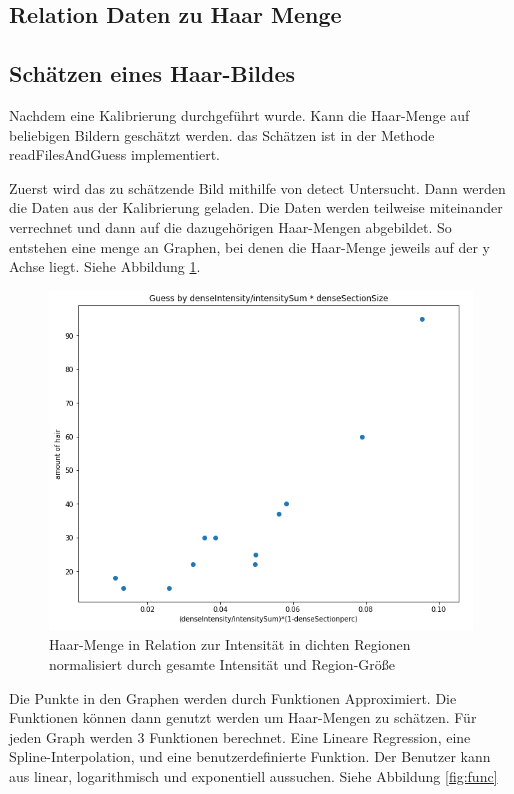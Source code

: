 \documentclass[german,a4paper,12pt]{llncs}
\begin{document}
\subsection{Relation Daten zu Haar Menge}



\subsection{Schätzen eines Haar-Bildes}

Nachdem eine Kalibrierung durchgeführt wurde. Kann die Haar-Menge auf beliebigen Bildern geschätzt werden.
das Schätzen ist in der Methode readFilesAndGuess implementiert.

Zuerst wird das zu schätzende Bild mithilfe von detect Untersucht.
Dann werden die Daten aus der Kalibrierung geladen. 
Die Daten werden teilweise miteinander verrechnet und dann auf die dazugehörigen Haar-Mengen abgebildet.
So entstehen eine menge an Graphen, bei denen die Haar-Menge jeweils auf der y Achse liegt. Siehe Abbildung \ref{fig:mapping}. 

\begin{figure}
	\centering
	\includegraphics[width=1.2\textwidth]{fig64/gh4.PNG}
	\caption[]{Haar-Menge in Relation zur Intensität in dichten Regionen normalisiert durch gesamte Intensität und Region-Größe}
	\label{fig:mapping}
\end{figure}

Die Punkte in den Graphen werden durch Funktionen Approximiert. Die Funktionen können dann genutzt werden um Haar-Mengen zu schätzen.
Für jeden Graph werden 3 Funktionen berechnet. Eine Lineare Regression, eine Spline-Interpolation, und eine benutzerdefinierte Funktion.
Der Benutzer kann aus linear, logarithmisch und exponentiell aussuchen.
Siehe Abbildung \ref{fig:func}
\end{document}
